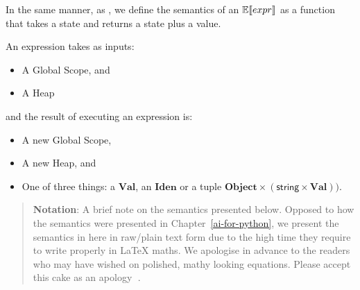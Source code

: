 In the same manner, as \textcite{fromherz_static_2018}, we define the semantics of an
\(\mathbb{E}\!\left\llbracket expr \right\rrbracket\) as a function that takes a state and returns a state plus a value.

An expression takes as inputs:

\begin{itemize}
\tightlist
\item A Global Scope, and
\item A Heap
\end{itemize}

and the result of executing an expression is:

\begin{itemize}
\tightlist
\item A new Global Scope,
\item A new Heap, and
\item One of three things: a \(\mathbf{Val}\), an \(\mathbf{Iden}\) or a tuple
  \(\mathbf{Object} \times (\textsf{string} \times \mathbf{Val}))\).
\end{itemize}


\begin{quote}
\textbf{Notation}: A brief note on the semantics presented below. Opposed to how
the semantics were presented in Chapter~\ref{ai-for-python}, we present the semantics in
here in raw/plain text form due to the high time they require to write properly in
\LaTeX{} maths. We apologise in advance to the readers who may have wished on polished, mathy
looking equations. Please accept this cake as an apology {\notoemojifont 🍰}.
\end{quote}


